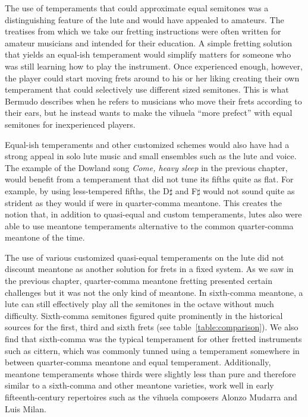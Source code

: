 The use of temperaments that could approximate equal semitones was a distinguishing
feature of the lute and would have appealed to amateurs. The treatises from which we
take our fretting instructions were often written for amateur musicians and intended
for their education. A simple fretting solution that yields an equal-ish temperament
would simplify matters for someone who was still learning how to play the instrument.
Once experienced enough, however, the player could start moving frets around to his or
her liking creating their own temperament that could selectively use different sized
semitones. This is what Bermudo describes when he refers to musicians who move their
frets according to their ears, but he instead wants to make the vihuela ``more
prefect'' with equal semitones for inexperienced players.\autocite[78]{DE:1}

Equal-ish temperaments and other customized schemes would also have had a strong appeal
in solo lute music and small ensembles such as the lute and voice.  The example of the
Dowland song \textit{Come, heavy sleep} in the previous chapter, would benefit from a
temperament that did not tune its fifths quite as flat.  For example, by using
less-tempered fifths, the D$\sharp$ and F$\sharp$ would not sound quite as strident as
they would if were in quarter-comma meantone.  This creates the notion that, in
addition to quasi-equal and custom temperaments, lutes also were able to use meantone
temperaments alternative to the common quarter-comma meantone of the time.

The use of various customized quasi-equal temperaments on the lute did not discount
meantone as another solution for frets in a fixed system. As we saw in the previous
chapter, quarter-comma meantone fretting presented certain challenges but it was not
the only kind of meantone. In sixth-comma meantone, a lute can still effectively play
all the semitones in the octave without much difficulty. Sixth-comma semitones figured
quite prominently in the historical sources for the first, third and sixth frets (see
table~\ref{table:comparison}). We also find that sixth-comma was the typical
temperament for other fretted instruments such as cittern, which was commonly tunned
using a temperament somewhere in between quarter-comma meantone and equal temperament.
\autocite[12]{PF:1}  Additionally, meantone temperaments whose thirds were slightly
less than pure and therefore similar to a sixth-comma and other meantone varieties,
work well in early fifteenth-century repertoires such as the vihuela composers Alonzo
Mudarra and Luis Milan.\autocite[56]{WH:1}


